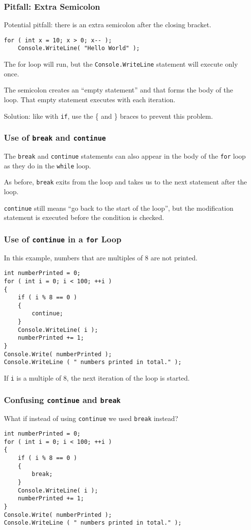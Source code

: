 \begin{frame}[fragile]
\frametitle{Pitfall: Extra Semicolon}

Potential pitfall: there is an extra semicolon after the closing bracket.

\begin{verbatim}
for ( int x = 10; x > 0; x-- );
    Console.WriteLine( "Hello World" );
\end{verbatim}

The for loop will run, but the \texttt{Console.WriteLine} statement will execute only once.

The semicolon creates an ``empty statement'' and that forms the body of the loop. That empty statement executes with each iteration.

Solution: like with \texttt{if}, use the \{ and \} braces to prevent this problem.

\end{frame}

\begin{frame}
\frametitle{Use of \texttt{break} and \texttt{continue}}

The \texttt{break} and \texttt{continue} statements can also appear in the body of the \texttt{for} loop as they do in the \texttt{while} loop.

As before, \texttt{break} exits from the loop and takes us to the next statement after the loop.

\texttt{continue} still means ``go back to the start of the loop'', but the modification statement is executed before the condition is checked.

\end{frame}

\begin{frame}[fragile]
\frametitle{Use of \texttt{continue} in a \texttt{for} Loop}
In this example, numbers that are multiples of 8 are not printed.
\begin{verbatim}
int numberPrinted = 0;
for ( int i = 0; i < 100; ++i )
{
    if ( i % 8 == 0 )
    {
        continue;
    }
    Console.WriteLine( i );
    numberPrinted += 1;
}
Console.Write( numberPrinted );
Console.WriteLine ( " numbers printed in total." );
\end{verbatim}

If \texttt{i} is a multiple of 8, the next iteration of the loop is started.

\end{frame}

\begin{frame}[fragile]
\frametitle{Confusing \texttt{continue} and \texttt{break}}
What if instead of using \texttt{continue} we used \texttt{break} instead?
\begin{verbatim}
int numberPrinted = 0;
for ( int i = 0; i < 100; ++i )
{
    if ( i % 8 == 0 )
    {
        break;
    }
    Console.WriteLine( i );
    numberPrinted += 1;
}
Console.Write( numberPrinted );
Console.WriteLine ( " numbers printed in total." );
\end{verbatim}



\end{frame}

